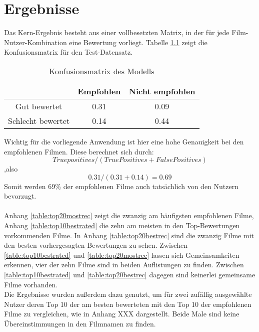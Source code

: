 \chapter{Ergebnisse}

Das Kern-Ergebnis besteht aus einer vollbesetzten Matrix, in der für jede Film-Nutzer-Kombination eine Bewertung vorliegt. Tabelle \ref{table:confusion_matrix} zeigt die Konfusionsmatrix für den Test-Datensatz.
\begin{table}[h]
\centering
\begin{tabular}{c|c|c|}
& Empfohlen & Nicht empfohlen \\
\hline 
Gut bewertet & \hspace{1cm} 0.31 \hspace{1cm} & \hspace{1cm} 0.09 \hspace{1cm} \\
\hline 
Schlecht bewertet & 0.14 & 0.44 \\
\hline 
\end{tabular}
\caption{Konfusionsmatrix des Modells}
\label{table:confusion_matrix}
\end{table}
Wichtig für die vorliegende Anwendung ist hier eine hohe  Genauigkeit bei den empfohlenen Filmen. Diese berechnet sich durch:
\\
\begin{equation}
True positives / (True Positives + False Positives)
\end{equation}
,also
\begin{equation}
0.31 / (0.31 + 0.14) = 0.69
\end{equation}
Somit werden 69\% der empfohlenen Filme auch tatsächlich von den Nutzern bevorzugt.
\\
\\
Anhang \ref{table:top20mostrec} zeigt die zwanzig am häufigsten empfohlenen Filme, Anhang \ref{table:top10bestrated} die zehn am meisten in den Top-Bewertungen vorkommenden Filme. In Anhang \ref{table:top20bestrec} sind die zwanzig Filme mit den besten vorhergesagten Bewertungen zu sehen. Zwischen \ref{table:top10bestrated} und \ref{table:top20mostrec} lassen sich Gemeinsamkeiten erkennen, vier der zehn Filme sind in beiden Auflistungen zu finden. Zwischen \ref{table:top10bestrated} und \ref{table:top20bestrec} dagegen sind keinerlei gemeinsame Filme vorhanden.
\\
Die Ergebnisse wurden außerdem dazu genutzt, um für zwei zufällig ausgewählte Nutzer deren Top 10 der am besten bewerteten mit den Top 10 der empfohlenen Filme zu vergleichen, wie in Anhang XXX dargestellt. Beide Male sind keine Übereinstimmungen in den Filmnamen zu finden.
